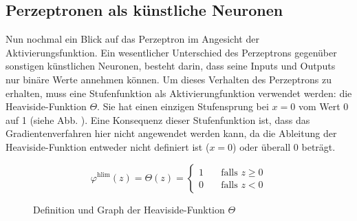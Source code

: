 \subsection{Perzeptronen als künstliche Neuronen}\label{sec:heaviside}
Nun nochmal ein Blick auf das Perzeptron im Angesicht der Aktivierungsfunktion.
Ein wesentlicher Unterschied des Perzeptrons gegenüber sonstigen künstlichen
Neuronen, besteht darin, dass seine Inputs und Outputs nur binäre Werte
annehmen können. Um dieses Verhalten des Perzeptrons zu erhalten,
muss eine Stufenfunktion als Aktivierungfunktion verwendet werden: die Heaviside-Funktion $\Theta$.
Sie hat einen einzigen Stufensprung bei $x=0$ vom Wert 0 auf 1 (siehe Abb.
). Eine Konsequenz dieser Stufenfunktion ist, dass das
Gradientenverfahren hier nicht angewendet werden kann, da die Ableitung der
Heaviside-Funktion entweder nicht definiert ist ($x=0$) oder überall 0 beträgt.
\\
\begin{figure}[h!]
  \begin{minipage}[h!]{0.5\textwidth}
    \begin{equation*}
      \varphi^{\text{hlim}}(z) = \Theta(z) =
      \begin{cases}
        1 & \quad \text{falls } z \geq 0\\
        0 & \quad \text{falls } z < 0
      \end{cases}
    \end{equation*}
  \end{minipage}
  \begin{minipage}[h!]{0.5\textwidth}
    \centering
  \end{minipage}
  \caption{Definition und Graph der Heaviside-Funktion $\Theta$}
  \label{fig:heaviside}
\end{figure}

